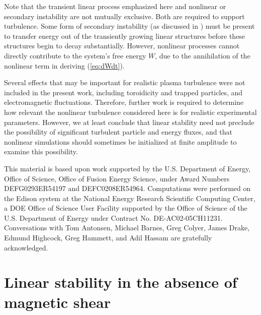 \documentclass[12pt,superscriptaddress]{revtex4}
\begin{document}
Note that the transient linear process emphasized here and nonlinear or secondary instability are not mutually
exclusive. Both are required to support turbulence.
Some form of secondary instability (as discussed in \cite{Drake}) must be present to transfer energy out of the transiently growing linear
structures before these structures begin to decay substantially. However, nonlinear processes cannot
directly contribute to the system's free energy $W$, due to the annihilation of the nonlinear term
in deriving (\ref{eq:dWdt}).

Several effects that may be important for realistic plasma turbulence
were not included in the present work, including toroidicity and trapped particles,
and electromagnetic fluctuations.
Therefore, further work is required to determine how relevant the nonlinear turbulence considered here
is for realistic experimental parameters.  However, we at least conclude that linear stability
need not preclude the possibility of significant turbulent particle and energy fluxes,
and that nonlinear simulations should sometimes be initialized at finite amplitude to examine this possibility.

\begin{acknowledgments}
This material is based upon work supported by the
U.S. Department of Energy, Office of Science, Office of Fusion Energy Science,
under Award Numbers DEFG0293ER54197 and DEFC0208ER54964.
Computations were performed on the Edison system at
the National Energy Research Scientific Computing Center, a DOE Office of Science User Facility supported by the Office of Science of the U.S. Department of Energy under Contract No. DE-AC02-05CH11231.
Conversations with 
Tom Antonsen, Michael Barnes, Greg Colyer, James Drake, Edmund Highcock, Greg Hammett, and Adil Hassam
are gratefully acknowledged.
\end{acknowledgments}


\appendix

\section{Linear stability in the absence of magnetic shear}
\label{appendix:zeroShear}
\end{document}
